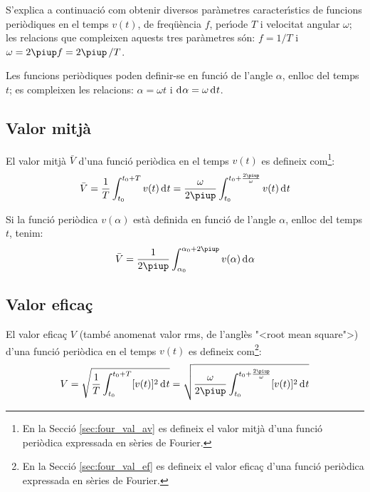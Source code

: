 S'explica a continuaci\'{o} com obtenir diversos par\`{a}metres caracter\'{\i}stics de funcions peri\`{o}diques  en el temps $v(t)$, de freq\"{u}\`{e}ncia $f$, per\'{\i}ode $T$ i velocitat angular $\omega$; les relacions que compleixen aquests tres par\`{a}metres s\'{o}n: $f = 1/T$ i $\omega=2\piup f = 2\piup\,/T$.

Les funcions peri\`{o}diques poden  definir-se en funci\'{o} de l'angle $\alpha$, enlloc del temps $t$; es compleixen les relacions:
$\alpha=\omega t$ i $\diff\alpha=\omega\diff t$.

\subsection{Valor mitj\`{a}}

El valor mitj\`{a} $\bar{V}$ d'una funci\'{o}
peri\`{o}dica en el temps $v(t)$ es
defineix com\footnote{En la Secci\'{o} \ref{sec:four_val_av} es defineix el valor mitj\`{a} d'una funci\'{o} peri\`{o}dica expressada en s\`{e}ries de Fourier.}:
\begin{equation}
    \bar{V} = \frac{1}{T} \int_{t_0}^{t_0+T} v(t) \diff t =
    \frac{\omega}{2\piup} \int_{t_0}^{t_0+\frac{2\piup}{\omega}} v(t) \diff t\label{eq:vm_t}
\end{equation}

Si la funci\'{o} peri\`{o}dica $v(\alpha)$ est\`{a} definida en funci\'{o} de
l'angle $\alpha$, enlloc del temps $t$, tenim:
\begin{equation}
    \bar{V} = \frac{1}{2\piup} \int_{\alpha_0}^{\alpha_0+2\piup} v(\alpha) \diff \alpha
    \label{eq:vm_alfa}
\end{equation}

\subsection{Valor efica\c{c}}

El valor efica\c{c}  $V$ (tamb\'{e} anomenat valor rms, de l'angl\`{e}s {"<}root
mean square{">}) d'una funci\'{o} peri\`{o}dica en el temps $v(t)$ es defineix com\footnote{En la Secci\'{o} \ref{sec:four_val_ef} es defineix el valor efica\c{c} d'una funci\'{o} peri\`{o}dica expressada en s\`{e}ries de Fourier.}:
\begin{equation}
    V = \sqrt{\frac{1}{T} \int_{t_0}^{t_0+T} [v(t)]^2 \diff
    t} = \sqrt{\frac{\omega}{2\piup} \int_{t_0}^{t_0+\frac{2\piup}{\omega}}
     [v(t)]^2 \diff t}
\end{equation}

